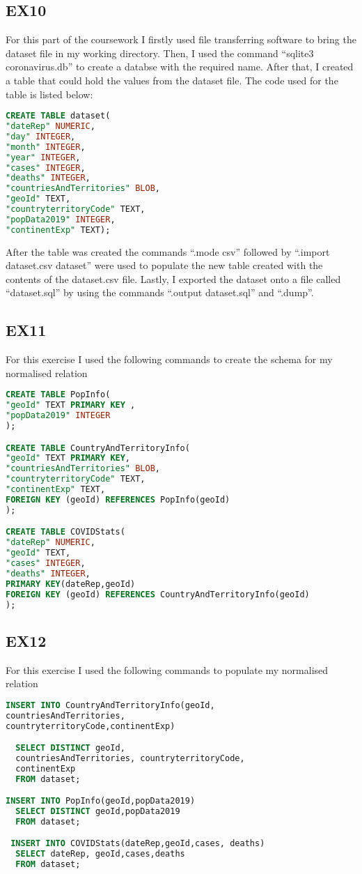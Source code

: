 \documentclass{report}
\begin{document}
\subsection{EX10}
For this part of the coursework I firstly used file transferring software to bring the dataset file in my working directory. Then, I used the command “sqlite3 coronavirus.db” to create a databse with the required name. After that, I created a table that could hold the values from the dataset file. The code used for the table is listed below: 
\begin{lstlisting}[language=SQL]
CREATE TABLE dataset(
"dateRep" NUMERIC,
"day" INTEGER,
"month" INTEGER,
"year" INTEGER,
"cases" INTEGER,
"deaths" INTEGER,
"countriesAndTerritories" BLOB,
"geoId" TEXT,
"countryterritoryCode" TEXT,
"popData2019" INTEGER,
"continentExp" TEXT);
\end{lstlisting}
After the table was created the commands “.mode csv” followed by “.import dataset.csv dataset” were used to populate the new table created with the contents of the dataset.csv file. Lastly, I exported the dataset onto a file called “dataset.sql” by using the commands “.output dataset.sql” and “.dump”.
\subsection{EX11}
For this exercise I used the following commands to create the schema for my normalised relation
\begin{lstlisting}[language=SQL]
CREATE TABLE PopInfo(
"geoId" TEXT PRIMARY KEY ,
"popData2019" INTEGER
);

CREATE TABLE CountryAndTerritoryInfo(
"geoId" TEXT PRIMARY KEY,
"countriesAndTerritories" BLOB,
"countryterritoryCode" TEXT,
"continentExp" TEXT,
FOREIGN KEY (geoId) REFERENCES PopInfo(geoId)
);

CREATE TABLE COVIDStats(
"dateRep" NUMERIC,
"geoId" TEXT,
"cases" INTEGER,
"deaths" INTEGER,
PRIMARY KEY(dateRep,geoId)
FOREIGN KEY (geoId) REFERENCES CountryAndTerritoryInfo(geoId)
);

\end{lstlisting}
\subsection{EX12}
For this exercise I used the following commands to populate my normalised relation
\begin{lstlisting}[language=SQL]
INSERT INTO CountryAndTerritoryInfo(geoId,
countriesAndTerritories,
countryterritoryCode,continentExp)

  SELECT DISTINCT geoId,
  countriesAndTerritories, countryterritoryCode,
  continentExp
  FROM dataset;

INSERT INTO PopInfo(geoId,popData2019)
  SELECT DISTINCT geoId,popData2019
  FROM dataset;	

 INSERT INTO COVIDStats(dateRep,geoId,cases, deaths)
  SELECT dateRep, geoId,cases,deaths
  FROM dataset;
\end{lstlisting}
\end{document}
